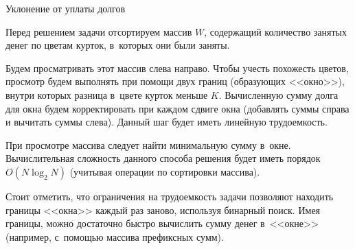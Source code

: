 \begin{tutorial}{Уклонение от уплаты долгов}

Перед решением задачи отсортируем массив $W$, содержащий количество занятых денег по цветам курток, в~которых они были заняты.

Будем просматривать этот массив слева направо. Чтобы учесть похожесть цветов, просмотр будем выполнять при помощи двух границ (образующих <<окно>>), внутри которых разница в~цвете курток меньше $K$. Вычисленную сумму долга для окна будем корректировать при каждом сдвиге окна (добавлять суммы справа и вычитать суммы слева). Данный шаг будет иметь линейную трудоемкость.

При просмотре массива следует найти минимальную сумму в~окне. Вычислительная сложность данного способа решения будет иметь порядок $O(N \log_2 N)$ (учитывая операции по сортировки массива).

Стоит отметить, что ограничения на трудоемкость задачи позволяют находить границы <<окна>> каждый раз заново, используя бинарный поиск. Имея границы, можно достаточно быстро вычислить сумму денег в~<<окне>> (например, с~помощью массива префиксных сумм).


\end{tutorial}
